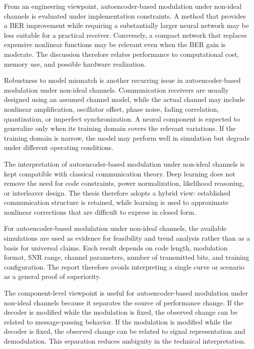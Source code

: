 From an engineering viewpoint, autoencoder-based modulation under non-ideal channels is evaluated under implementation constraints. A method that provides a BER improvement while requiring a substantially larger neural network may be less suitable for a practical receiver. Conversely, a compact network that replaces expensive nonlinear functions may be relevant even when the BER gain is moderate. The discussion therefore relates performance to computational cost, memory use, and possible hardware realization.

Robustness to model mismatch is another recurring issue in autoencoder-based modulation under non-ideal channels. Communication receivers are usually designed using an assumed channel model, while the actual channel may include nonlinear amplification, oscillator offset, phase noise, fading correlation, quantization, or imperfect synchronization. A neural component is expected to generalize only when its training domain covers the relevant variations. If the training domain is narrow, the model may perform well in simulation but degrade under different operating conditions.

The interpretation of autoencoder-based modulation under non-ideal channels is kept compatible with classical communication theory. Deep learning does not remove the need for code constraints, power normalization, likelihood reasoning, or interleaver design. The thesis therefore adopts a hybrid view: established communication structure is retained, while learning is used to approximate nonlinear corrections that are difficult to express in closed form.

For autoencoder-based modulation under non-ideal channels, the available simulations are used as evidence for feasibility and trend analysis rather than as a basis for universal claims. Each result depends on code length, modulation format, SNR range, channel parameters, number of transmitted bits, and training configuration. The report therefore avoids interpreting a single curve or scenario as a general proof of superiority.

The component-level viewpoint is useful for autoencoder-based modulation under non-ideal channels because it separates the source of performance change. If the decoder is modified while the modulation is fixed, the observed change can be related to message-passing behavior. If the modulation is modified while the decoder is fixed, the observed change can be related to signal representation and demodulation. This separation reduces ambiguity in the technical interpretation.

